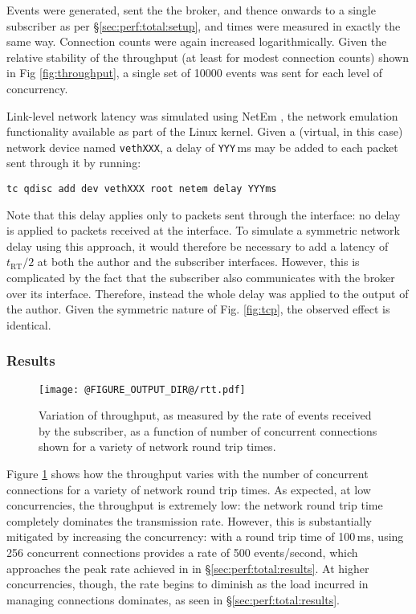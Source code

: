 \documentclass[5p,authoryear]{elsarticle}
\begin{document}
Events were generated, sent the the broker, and thence onwards to a single
subscriber as per \S\ref{sec:perf:total:setup}, and times were measured in
exactly the same way. Connection counts were again increased logarithmically.
Given the relative stability of the throughput (at least for modest connection
counts) shown in Fig \ref{fig:throughput}, a single set of 10000 events was
sent for each level of concurrency.

Link-level network latency was simulated using NetEm \citep{Hemminger:2005},
the network emulation functionality available as part of the Linux kernel.
Given a (virtual, in this case) network device named \texttt{vethXXX}, a
delay of \texttt{YYY}\,ms may be added to each packet sent through it by
running:
\begin{verbatim}
tc qdisc add dev vethXXX root netem delay YYYms
\end{verbatim}
Note that this delay applies only to packets sent through the interface: no
delay is applied to packets received at the interface. To simulate a symmetric
network delay using this approach, it would therefore be necessary to add a
latency of $t_\mathrm{RT} / 2$ at both the author and the subscriber
interfaces. However, this is complicated by the fact that the subscriber also
communicates with the broker over its interface. Therefore, instead the whole
delay was applied to the output of the author. Given the symmetric nature of
Fig. \ref{fig:tcp}, the observed effect is identical.

\subsubsection{Results}

\begin{figure}
  \begin{center}
  \texttt{[image: @FIGURE\_OUTPUT\_DIR@/rtt.pdf]}
  \end{center}

  \caption{Variation of throughput, as measured by the rate of events received
  by the subscriber, as a function of number of concurrent connections shown
  for a variety of network round trip times.}

  \label{fig:rtt}
\end{figure}

Figure \ref{fig:rtt} shows how the throughput varies with the number of
concurrent connections for a variety of network round trip times. As expected,
at low concurrencies, the throughput is extremely low: the network round trip
time completely dominates the transmission rate. However, this is
substantially mitigated by increasing the concurrency: with a round trip time
of 100\,ms, using 256 concurrent connections provides a rate of 500
events/second, which approaches the peak rate achieved in in
\S\ref{sec:perf:total:results}. At higher concurrencies, though, the rate
begins to diminish as the load incurred in managing connections dominates,
as seen in \S\ref{sec:perf:total:results}.
\end{document}

